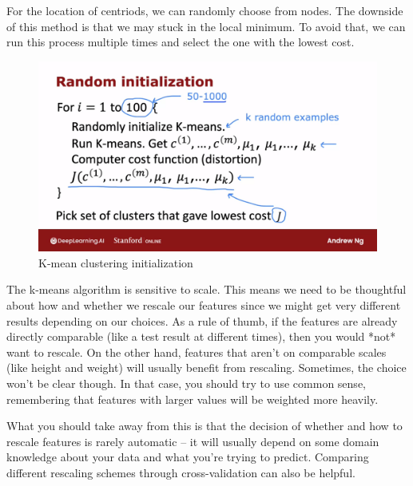 \documentclass[12pt]{report}
\begin{document}
For the location of centriods, we can randomly choose from nodes. The downside of this method is that we may stuck in the local minimum. To avoid that, we can run this process multiple times and select the one with the lowest cost.


\begin{figure}[H]
  \centering
  \includegraphics[trim =0.0cm 0.0cm 0.0cm 0.0cm, clip, scale=0.15]{pics/k-initialization.png}
  \caption{K-mean clustering initialization}
\end{figure}


The k-means algorithm is sensitive to scale. This means we need to be thoughtful about how and whether we rescale our features since we might get very different results depending on our choices. As a rule of thumb, if the features are already directly comparable (like a test result at different times), then you would *not* want to rescale. On the other hand, features that aren't on comparable scales (like height and weight) will usually benefit from rescaling. Sometimes, the choice won't be clear though. In that case, you should try to use common sense, remembering that features with larger values will be weighted more heavily.

What you should take away from this is that the decision of whether and how to rescale features is rarely automatic -- it will usually depend on some domain knowledge about your data and what you're trying to predict. Comparing different rescaling schemes through cross-validation can also be helpful.
\end{document}
